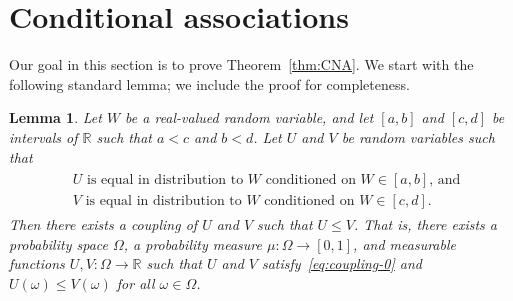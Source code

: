 \documentclass[12pt,english,reqno]{amsart}
\theoremstyle{plain}
\newtheorem{lemma}[thm]{Lemma}
\theoremstyle{remark}
\numberwithin{figure}{section}
\numberwithin{equation}{section}
\def\rr{\mathbb{R}}
\begin{document}
\section{Conditional associations}\label{sec:proof-CNA}
Our goal in this section is to prove Theorem~\ref{thm:CNA}. We start with the following standard lemma; we include the proof for completeness.

\begin{lemma}\label{lem:coupling}
	Let $W$ be a real-valued random variable, and let $[a,b]$ and $[c,d]$ be intervals of $\rr$ such that $a<c$ and $b<d$.
	Let $U$ and $V$ be random variables such that
	\begin{align}\label{eq:coupling-0}
		\begin{split}
			 & \text{$U$ is equal in distribution to $W$ conditioned on $W \in [a,b]$, and} \\
			 & \text{$V$ is equal in distribution to $W$ conditioned on $W \in [c,d]$.}
		\end{split}
	\end{align}
	Then there exists a coupling of $U$ and $V$ such that $U\leq V$. That is, there exists a probability space $\Omega$, a probability measure $\mu: \Omega \to [0,1]$, and measurable functions $U,V: \Omega \to \rr $ such that $U$ and $V$ satisfy~\eqref{eq:coupling-0} and $U(\omega) \leq V(\omega)$ for all $\omega \in \Omega$.
\end{lemma}
\end{document}
